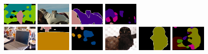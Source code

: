 {\begin{figure}[h]
		\includegraphics[width=0.15\textwidth]{image/result/error/p_2007_002539.png}
		\quad
		\includegraphics[width=0.15\textwidth]{image/result/error/2007_008964.jpg}
		\includegraphics[width=0.15\textwidth]{image/result/error/2007_008964.png}
		\includegraphics[width=0.15\textwidth]{image/result/error/p_2007_008964.png}
		\\
		\includegraphics[width=0.15\textwidth]{image/result/error/2008_000763.jpg}
		\includegraphics[width=0.15\textwidth]{image/result/error/2008_000763.png}
		\includegraphics[width=0.15\textwidth]{image/result/error/p_2008_000763.png}
		\quad
		\includegraphics[width=0.15\textwidth]{image/result/error/2007_009088.jpg}
		\includegraphics[width=0.15\textwidth]{image/result/error/2007_009088.png}
		\includegraphics[width=0.15\textwidth]{image/result/error/p_2007_009088.png}

\end{figure}}
